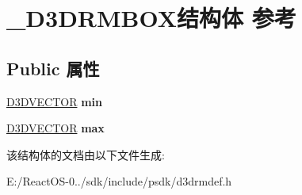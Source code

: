 \hypertarget{struct___d3_d_r_m_b_o_x}{}\section{\+\_\+\+D3\+D\+R\+M\+B\+O\+X结构体 参考}
\label{struct___d3_d_r_m_b_o_x}
\subsection*{Public 属性}
\begin{DoxyCompactItemize}
\item 
\mbox{\label{struct___d3_d_r_m_b_o_x_a1d2abeebd0a5a227f6bfcbe87a3fc4fc}} 
\hyperlink{struct___d3_d_v_e_c_t_o_r}{D3\+D\+V\+E\+C\+T\+OR} {\bfseries min}
\item 
\mbox{\label{struct___d3_d_r_m_b_o_x_a660d26e8b3a42ea7101914f60bcc2dcb}} 
\hyperlink{struct___d3_d_v_e_c_t_o_r}{D3\+D\+V\+E\+C\+T\+OR} {\bfseries max}
\end{DoxyCompactItemize}


该结构体的文档由以下文件生成\+:\begin{DoxyCompactItemize}
\item 
E\+:/\+React\+O\+S-\/0../sdk/include/psdk/d3drmdef.\+h\end{DoxyCompactItemize}
